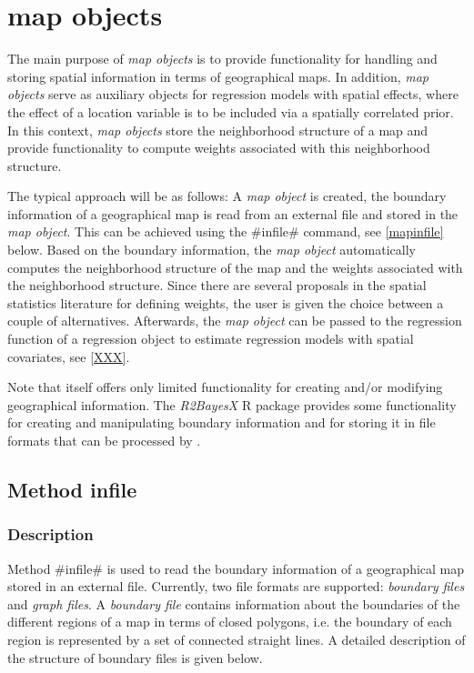\chapter{map objects}
\label{map} 

The main purpose of {\em map objects} is to provide functionality for handling and storing spatial information in terms of geographical maps. In addition, {\em map objects} serve as auxiliary objects for regression models with spatial effects, where the effect of a location variable is to be included via a spatially correlated prior. In this context, {\em map objects} store the neighborhood structure of a map and provide functionality to compute weights associated with this neighborhood structure.

The typical approach will be as follows: A {\em map object} is created, the boundary information of a geographical map is read from an external file and stored in the {\em map object}. This can be achieved using the #infile# command, see
\autoref{mapinfile} below. Based on the boundary information, the {\em map object} automatically computes the neighborhood
structure of the map and the weights associated with the neighborhood structure. Since there are several proposals in the
spatial statistics literature for defining weights, the user is given the choice between a couple of alternatives.  Afterwards, the {\em map object} can be passed to the regression function of a regression object to estimate regression models with spatial covariates, see \autoref{XXX}.

Note that \BayesX itself offers only limited functionality for creating and/or modifying geographical information. The {\it R2BayesX} R package provides some functionality for creating and manipulating boundary information and for storing it in file formats that can be processed by \BayesX.

\section{Method infile}
 \label{mapinfile} 

\subsection{Description}

Method #infile# is used to read the boundary information of a geographical map stored in an external file. Currently, two file formats are supported: {\em boundary files} and {\em graph files}. A {\em boundary file} contains information about the boundaries of the different regions of a map in terms of closed polygons, i.e. the boundary of each region is represented by a set of connected straight lines. A detailed description of the structure of boundary files is given below.

